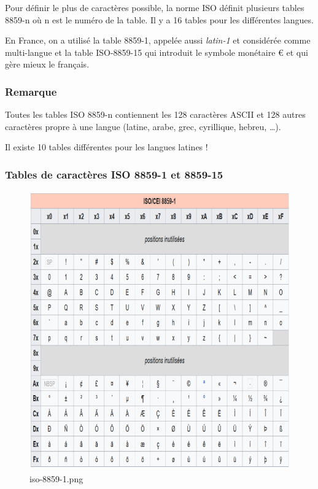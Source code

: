 \documentclass[11pt]{article}
\begin{document}
Pour définir le plus de caractères possible, la norme ISO définit
plusieurs tables 8859-n où n est le numéro de la table. Il y a 16 tables
pour les différentes langues.

En France, on a utilisé la table 8859-1, appelée aussi \emph{latin-1} et
considérée comme multi-langue et la table ISO-8859-15 qui introduit le
symbole monétaire € et qui gère mieux le français.

\hypertarget{remarque-1}{%
\subsubsection*{Remarque}\label{remarque-1}}

Toutes les tables ISO 8859-n contiennent les 128 caractères ASCII et 128
autres caractères propre à une langue (latine, arabe, grec, cyrillique,
hebreu, \ldots).

Il existe 10 tables différentes pour les langues latines !

\hypertarget{tables-de-caractuxe8res-iso-8859-1-et-8859-15}{%
\subsubsection*{Tables de caractères ISO 8859-1 et
8859-15}\label{tables-de-caractuxe8res-iso-8859-1-et-8859-15}}

\begin{figure}
\centering
\includegraphics{img/iso-8859-1.png}
\caption{iso-8859-1.png}
\end{figure}
\end{document}
